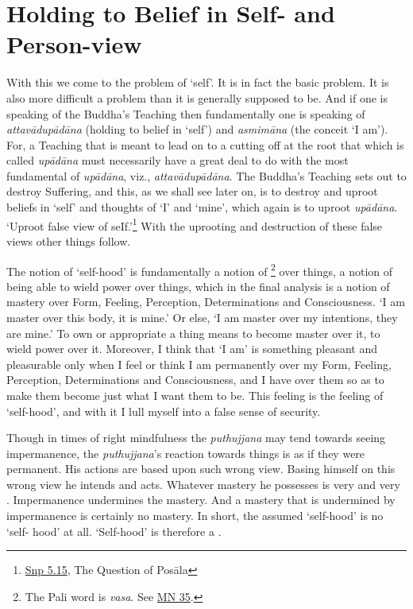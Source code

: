 \chapter{Holding to Belief in Self- and Person-view}

With this we come to the problem of `self'. It is in fact the basic problem. It is also more difficult a problem than it is generally supposed to be. And if one is speaking of the Buddha's Teaching then fundamentally one is speaking of \emph{attavādupādāna} (holding to belief in `self') and \emph{asmimāna} (the conceit `I am'). For, a Teaching that is meant to lead on to a cutting off at the root that which is called \emph{upādāna} must necessarily have a great deal to do with the most fundamental of \emph{upādāna}, viz., \emph{attavādupādāna}. The Buddha's Teaching sets out to destroy Suffering, and this, as we shall see later on, is to destroy and uproot beliefs in `self' and thoughts of `I' and `mine', which again is to uproot \emph{upādāna}. `Uproot false view of seIf.'\footnote{\href{https://suttacentral.net/snp5.15/en/sujato}{Snp 5.15}, The Question of Posāla} With the uprooting and destruction of these false views other things follow.

The notion of `self-hood' is fundamentally a notion of \footnote{The Pali word is \emph{vasa}. See \href{https://suttacentral.net/mn35/en/sujato}{MN 35}.} over things, a notion of being able to wield power over things, which in the final analysis is a notion of mastery over Form, Feeling, Perception, Determinations and Consciousness. `I am master over this body, it is mine.' Or else, `I am master over my intentions, they are mine.' To own or appropriate a thing means to become master over it, to wield power over it. Moreover, I think that `I am' is something pleasant and pleasurable only when I feel or think I am permanently  over my Form, Feeling, Perception, Determinations and Consciousness, and I have  over them so as to make them become just what I want them to be. This feeling is the feeling of `self-hood', and with it I lull myself into a false sense of security.

Though in times of right mindfulness the \emph{puthujjana} may tend towards seeing impermanence, the \emph{puthujjana}'s reaction towards things is as if they were permanent. His actions are based upon such wrong view. Basing himself on this wrong view he intends and acts. Whatever mastery he possesses is very  and very . Impermanence undermines the mastery. And a mastery that is undermined by impermanence is certainly no mastery. In short, the assumed `self-hood' is no `self- hood' at all. `Self-hood' is therefore a .

